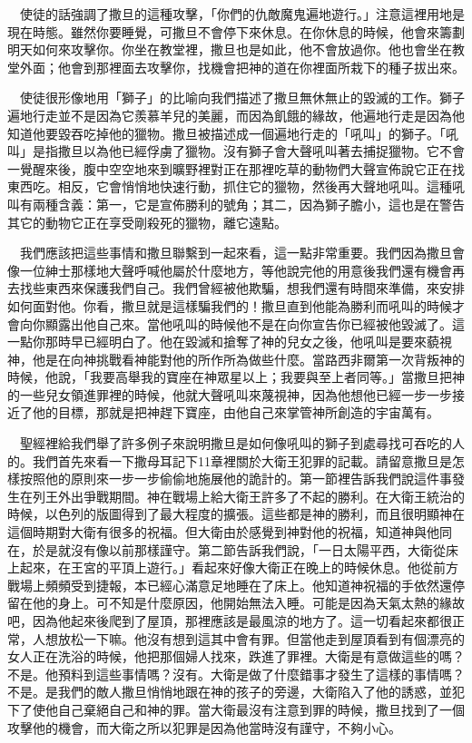 \documentclass{book}
\begin{document}
　使徒的話強調了撒旦的這種攻擊，「你們的仇敵魔鬼遍地遊行。」注意這裡用地是現在時態。雖然你要睡覺，可撒旦不會停下來休息。在你休息的時候，他會來籌劃明天如何來攻擊你。你坐在教堂裡，撒旦也是如此，他不會放過你。他也會坐在教堂外面；他會到那裡面去攻擊你，找機會把神的道在你裡面所栽下的種子拔出來。

　使徒很形像地用「獅子」的比喻向我們描述了撒旦無休無止的毀滅的工作。獅子遍地行走並不是因為它羨慕羊兒的美麗，而因為飢餓的緣故，他遍地行走是因為他知道他要毀吞吃掉他的獵物。撒旦被描述成一個遍地行走的「吼叫」的獅子。「吼叫」是指撒旦以為他已經俘虜了獵物。沒有獅子會大聲吼叫著去捕捉獵物。它不會一覺醒來後，腹中空空地來到曠野裡對正在那裡吃草的動物們大聲宣佈說它正在找東西吃。相反，它會悄悄地快速行動，抓住它的獵物，然後再大聲地吼叫。這種吼叫有兩種含義：第一，它是宣佈勝利的號角；其二，因為獅子膽小，這也是在警告其它的動物它正在享受剛殺死的獵物，離它遠點。

　我們應該把這些事情和撒旦聯繫到一起來看，這一點非常重要。我們因為撒旦會像一位紳士那樣地大聲呼喊他屬於什麼地方，等他說完他的用意後我們還有機會再去找些東西來保護我們自己。我們曾經被他欺騙，想我們還有時間來準備，來安排如何面對他。你看，撒旦就是這樣騙我們的！撒旦直到他能為勝利而吼叫的時候才會向你顯露出他自己來。當他吼叫的時候他不是在向你宣告你已經被他毀滅了。這一點你那時早已經明白了。他在毀滅和搶奪了神的兒女之後，他吼叫是要來藐視神，他是在向神挑戰看神能對他的所作所為做些什麼。當路西非爾第一次背叛神的時候，他說，「我要高舉我的寶座在神眾星以上；我要與至上者同等。」當撒旦把神的一些兒女領進罪裡的時候，他就大聲吼叫來蔑視神，因為他想他已經一步一步接近了他的目標，那就是把神趕下寶座，由他自己來掌管神所創造的宇宙萬有。

　聖經裡給我們舉了許多例子來說明撒旦是如何像吼叫的獅子到處尋找可吞吃的人的。我們首先來看一下撒母耳記下11章裡關於大衛王犯罪的記載。請留意撒旦是怎樣按照他的原則來一步一步偷偷地施展他的詭計的。第一節裡告訴我們說這件事發生在列王外出爭戰期間。神在戰場上給大衛王許多了不起的勝利。在大衛王統治的時候，以色列的版圖得到了最大程度的擴張。這些都是神的勝利，而且很明顯神在這個時期對大衛有很多的祝福。但大衛由於感覺到神對他的祝福，知道神與他同在，於是就沒有像以前那樣謹守。第二節告訴我們說，「一日太陽平西，大衛從床上起來，在王宮的平頂上遊行。」看起來好像大衛正在晚上的時候休息。他從前方戰場上頻頻受到捷報，本已經心滿意足地睡在了床上。他知道神祝福的手依然還停留在他的身上。可不知是什麼原因，他開始無法入睡。可能是因為天氣太熱的緣故吧，因為他起來後爬到了屋頂，那裡應該是最風涼的地方了。這一切看起來都很正常，人想放松一下嘛。他沒有想到這其中會有罪。但當他走到屋頂看到有個漂亮的女人正在洗浴的時候，他把那個婦人找來，跌進了罪裡。大衛是有意做這些的嗎？不是。他預料到這些事情嗎？沒有。大衛是做了什麼錯事才發生了這樣的事情嗎？不是。是我們的敵人撒旦悄悄地跟在神的孩子的旁邊，大衛陷入了他的誘惑，並犯下了使他自己棄絕自己和神的罪。當大衛最沒有注意到罪的時候，撒旦找到了一個攻擊他的機會，而大衛之所以犯罪是因為他當時沒有謹守，不夠小心。
\end{document}
